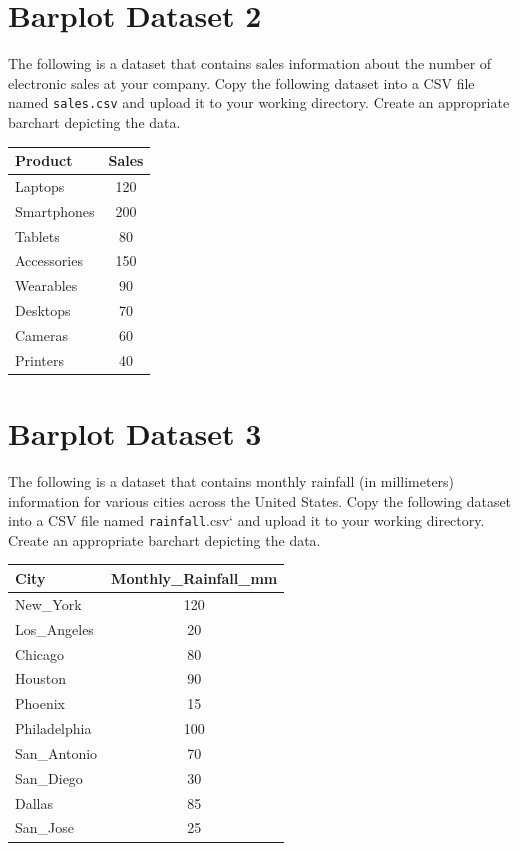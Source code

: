 \documentclass[
  letterpaper,
  DIV=11,
  numbers=noendperiod]{scrreprt}
\begin{document}
\section*{Barplot Dataset 2}\label{barplot-dataset-2}


The following is a dataset that contains sales information about the
number of electronic sales at your company. Copy the following dataset
into a CSV file named \texttt{sales.csv} and upload it to your working
directory. Create an appropriate barchart depicting the data.

\begin{longtable}[]{@{}lc@{}}
\toprule\noalign{}
Product & Sales \\
\midrule\noalign{}
\endhead
\bottomrule\noalign{}
\endlastfoot
Laptops & 120 \\
Smartphones & 200 \\
Tablets & 80 \\
Accessories & 150 \\
Wearables & 90 \\
Desktops & 70 \\
Cameras & 60 \\
Printers & 40 \\
\end{longtable}

\section*{Barplot Dataset 3}\label{barplot-dataset-3}


The following is a dataset that contains monthly rainfall (in
millimeters) information for various cities across the United States.
Copy the following dataset into a CSV file named \texttt{rainfall}.csv`
and upload it to your working directory. Create an appropriate barchart
depicting the data.

\begin{longtable}[]{@{}lc@{}}
\toprule\noalign{}
City & Monthly\_Rainfall\_mm \\
\midrule\noalign{}
\endhead
\bottomrule\noalign{}
\endlastfoot
New\_York & 120 \\
Los\_Angeles & 20 \\
Chicago & 80 \\
Houston & 90 \\
Phoenix & 15 \\
Philadelphia & 100 \\
San\_Antonio & 70 \\
San\_Diego & 30 \\
Dallas & 85 \\
San\_Jose & 25 \\
\end{longtable}
\end{document}

